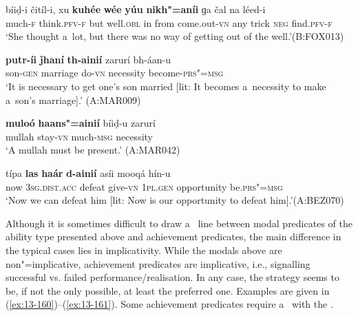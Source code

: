 \begin{exe}
\ex
\label{ex:13-156}
\gll bíiḍ-i čitíl-i, xu \textbf{kuhée} \textbf{wée} \textbf{yúu} \textbf{  nikh"=aníi} ɡa čal na léed-i  \\
much-\textsc{f} think.\textsc{pfv-f} but well.\textsc{obl} in from  come.out-\textsc{vn} any trick \textsc{neg} find.\textsc{pfv-f}  \\
\glt `She thought a~lot, but there was no way of getting out of the well.'\newline (B:FOX013)

\ex
\label{ex:13-157}
\gll \textbf{putr-íi} \textbf{ǰhaní} \textbf{th-ainií} zarurí bh-áan-u \\
son-\textsc{gen} marriage do-\textsc{vn} necessity become-\textsc{prs"=msg}  \\
\glt `It is necessary to get one's son married [lit: It becomes a~necessity to make a~son's marriage].' (A:MAR009)

\ex
\label{ex:13-158}
\gll \textbf{muloó} \textbf{haans"=ainií} bíiḍ-u zarurí \\
mullah stay-\textsc{vn}  much-\textsc{msg} necessity  \\
\glt `A mullah must be present.' (A:MAR042)

\ex
\label{ex:13-159}
\gll típa \textbf{las} \textbf{haár} \textbf{d-ainií} asíi mooqá  hín-u \\
now \textsc{3sg.dist.acc} defeat give-\textsc{vn} \textsc{1pl.gen} opportunity be.\textsc{prs"=msg}  \\
\glt `Now we can defeat him [lit: Now is our opportunity to defeat him].'\newline (A:BEZ070) 
\end{exe}

 Although it is sometimes difficult to draw a~ line between modal predicates of the ability type presented above and achievement predicates, the main difference in the typical cases lies in implicativity. While the modals above are non"=implicative, achievement predicates are implicative, i.e., signalling successful vs. failed performance/realisation. In any case, the  strategy seems to be, if not the only possible, at least the preferred one. Examples are given in (\ref{ex:13-160})--(\ref{ex:13-161}). Some achievement predicates require a~ with the .

